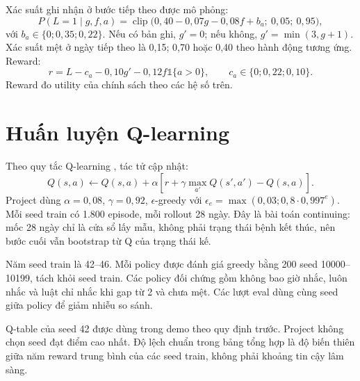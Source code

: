 Xác suất ghi nhận ở bước tiếp theo được mô phỏng:
\begin{equation}
P(L=1\mid g,f,a)=\operatorname{clip}\bigl(0,40-0,07g-0,08f+b_a;\ 0,05;\ 0,95\bigr),
\end{equation}
với $b_a\in\{0;0,35;0,22\}$. Nếu có bản ghi, $g'=0$; nếu không, $g'=\min(3,g+1)$. Xác suất mệt ở ngày tiếp theo là 0,15; 0,70 hoặc 0,40 theo hành động tương ứng. Reward:
\begin{equation}
r=L-c_a-0,10g'-0,12f\mathbb{1}\{a>0\}, \qquad c_a\in\{0;0,22;0,10\}.
\end{equation}
Reward đo utility của chính sách theo các hệ số trên.

\section{Huấn luyện Q-learning}
Theo quy tắc Q-learning \cite{watkins}, tác tử cập nhật:
\begin{equation}
Q(s,a)\leftarrow Q(s,a)+\alpha\left[r+\gamma\max_{a'}Q(s',a')-Q(s,a)\right].
\end{equation}
Project dùng $\alpha=0,08$, $\gamma=0,92$, $\epsilon$-greedy với $\epsilon_e=\max(0,03;0,8\cdot0,997^e)$. Mỗi seed train có 1.800 episode, mỗi rollout 28 ngày. Đây là bài toán continuing: mốc 28 ngày chỉ là cửa sổ lấy mẫu, không phải trạng thái bệnh kết thúc, nên bước cuối vẫn bootstrap từ Q của trạng thái kế.

Năm seed train là 42--46. Mỗi policy được đánh giá greedy bằng 200 seed 10000--10199, tách khỏi seed train. Các policy đối chứng gồm không bao giờ nhắc, luôn nhắc và luật chỉ nhắc khi gap từ 2 và chưa mệt. Các lượt eval dùng cùng seed giữa policy để giảm nhiễu so sánh.

Q-table của seed 42 được dùng trong demo theo quy định trước. Project không chọn seed đạt điểm cao nhất. Độ lệch chuẩn trong bảng tổng hợp là độ biến thiên giữa năm reward trung bình của các seed train, không phải khoảng tin cậy lâm sàng.
